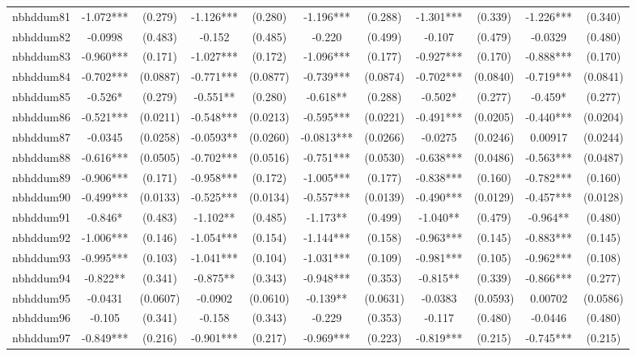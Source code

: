 \documentclass[]{article}
\begin{document}
\begin{tabular}{lcccccccccc}
nbhddum81 & -1.072*** & (0.279) & -1.126*** & (0.280) & -1.196*** & (0.288) & -1.301*** & (0.339) & -1.226*** & (0.340) \\
nbhddum82 & -0.0998 & (0.483) & -0.152 & (0.485) & -0.220 & (0.499) & -0.107 & (0.479) & -0.0329 & (0.480) \\
nbhddum83 & -0.960*** & (0.171) & -1.027*** & (0.172) & -1.096*** & (0.177) & -0.927*** & (0.170) & -0.888*** & (0.170) \\
nbhddum84 & -0.702*** & (0.0887) & -0.771*** & (0.0877) & -0.739*** & (0.0874) & -0.702*** & (0.0840) & -0.719*** & (0.0841) \\
nbhddum85 & -0.526* & (0.279) & -0.551** & (0.280) & -0.618** & (0.288) & -0.502* & (0.277) & -0.459* & (0.277) \\
nbhddum86 & -0.521*** & (0.0211) & -0.548*** & (0.0213) & -0.595*** & (0.0221) & -0.491*** & (0.0205) & -0.440*** & (0.0204) \\
nbhddum87 & -0.0345 & (0.0258) & -0.0593** & (0.0260) & -0.0813*** & (0.0266) & -0.0275 & (0.0246) & 0.00917 & (0.0244) \\
nbhddum88 & -0.616*** & (0.0505) & -0.702*** & (0.0516) & -0.751*** & (0.0530) & -0.638*** & (0.0486) & -0.563*** & (0.0487) \\
nbhddum89 & -0.906*** & (0.171) & -0.958*** & (0.172) & -1.005*** & (0.177) & -0.838*** & (0.160) & -0.782*** & (0.160) \\
nbhddum90 & -0.499*** & (0.0133) & -0.525*** & (0.0134) & -0.557*** & (0.0139) & -0.490*** & (0.0129) & -0.457*** & (0.0128) \\
nbhddum91 & -0.846* & (0.483) & -1.102** & (0.485) & -1.173** & (0.499) & -1.040** & (0.479) & -0.964** & (0.480) \\
nbhddum92 & -1.006*** & (0.146) & -1.054*** & (0.154) & -1.144*** & (0.158) & -0.963*** & (0.145) & -0.883*** & (0.145) \\
nbhddum93 & -0.995*** & (0.103) & -1.041*** & (0.104) & -1.031*** & (0.109) & -0.981*** & (0.105) & -0.962*** & (0.108) \\
nbhddum94 & -0.822** & (0.341) & -0.875** & (0.343) & -0.948*** & (0.353) & -0.815** & (0.339) & -0.866*** & (0.277) \\
nbhddum95 & -0.0431 & (0.0607) & -0.0902 & (0.0610) & -0.139** & (0.0631) & -0.0383 & (0.0593) & 0.00702 & (0.0586) \\
nbhddum96 & -0.105 & (0.341) & -0.158 & (0.343) & -0.229 & (0.353) & -0.117 & (0.480) & -0.0446 & (0.480) \\
nbhddum97 & -0.849*** & (0.216) & -0.901*** & (0.217) & -0.969*** & (0.223) & -0.819*** & (0.215) & -0.745*** & (0.215) \\

\end{tabular}
\end{document}
